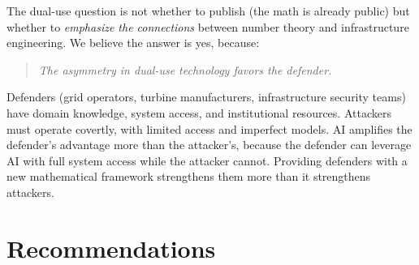 \documentclass[11pt,a4paper]{article}
\begin{document}
The dual-use question is not whether to publish (the math is
already public) but whether to \emph{emphasize the connections}
between number theory and infrastructure engineering. We believe
the answer is yes, because:

\begin{quote}
\emph{The asymmetry in dual-use technology favors the defender.}
\end{quote}

Defenders (grid operators, turbine manufacturers, infrastructure
security teams) have domain knowledge, system access, and
institutional resources. Attackers must operate covertly, with
limited access and imperfect models. AI amplifies the defender's
advantage more than the attacker's, because the defender can
leverage AI with full system access while the attacker cannot.
Providing defenders with a
new mathematical framework strengthens them more than it
strengthens attackers.

\section{Recommendations}
\end{document}

